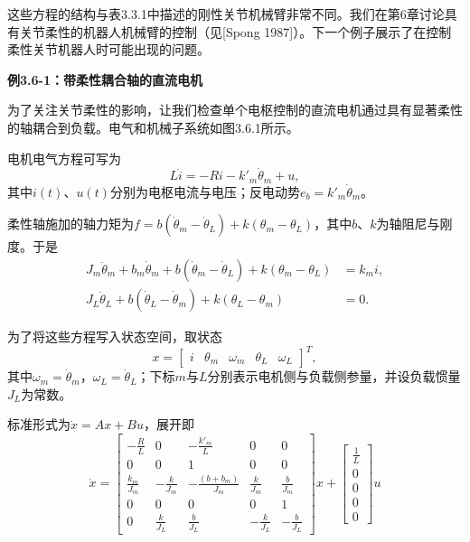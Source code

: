 \documentclass[12pt,a4paper]{ctexart}
\begin{document}
这些方程的结构与表3.3.1中描述的刚性关节机械臂非常不同。我们在第6章讨论具有关节柔性的机器人机械臂的控制（见[Spong 1987]）。下一个例子展示了在控制柔性关节机器人时可能出现的问题。

\textbf{例3.6-1：带柔性耦合轴的直流电机}

为了关注关节柔性的影响，让我们检查单个电枢控制的直流电机通过具有显著柔性的轴耦合到负载。电气和机械子系统如图3.6.1所示。

电机电气方程可写为
\begin{equation}\label{eq:3.6.17}
L\dot{i} = -Ri - k'_m\dot{\theta}_m + u,
\end{equation}
其中$i(t)$、$u(t)$分别为电枢电流与电压；反电动势$e_b = k'_m\dot{\theta}_m$。

柔性轴施加的轴力矩为$f = b(\dot{\theta}_m - \dot{\theta}_L) + k(\theta_m - \theta_L)$，其中$b$、$k$为轴阻尼与刚度。于是
\begin{align}\label{eq:3.6.18}
J_m\ddot{\theta}_m + b_m\dot{\theta}_m + b(\dot{\theta}_m - \dot{\theta}_L) + k(\theta_m - \theta_L) &= k_m i, \\
J_L\ddot{\theta}_L + b(\dot{\theta}_L - \dot{\theta}_m) + k(\theta_L - \theta_m) &= 0.
\end{align}

为了将这些方程写入状态空间，取状态
\begin{equation}\label{eq:3.6.19}
x = \begin{bmatrix} i & \theta_m & \omega_m & \theta_L & \omega_L \end{bmatrix}^T,
\end{equation}
其中$\omega_m=\dot{\theta}_m$，$\omega_L=\dot{\theta}_L$；下标$m$与$L$分别表示电机侧与负载侧参量，并设负载惯量$J_L$为常数。

标准形式为$\dot{x} = Ax + Bu$，展开即
\begin{equation}\label{eq:3.6.20}
\dot{x} = \begin{bmatrix} -\frac{R}{L} & 0 & -\frac{k'_m}{L} & 0 & 0 \\ 0 & 0 & 1 & 0 & 0 \\ \frac{k_m}{J_m} & -\frac{k}{J_m} & -\frac{(b+b_m)}{J_m} & \frac{k}{J_m} & \frac{b}{J_m} \\ 0 & 0 & 0 & 0 & 1 \\ 0 & \frac{k}{J_L} & \frac{b}{J_L} & -\frac{k}{J_L} & -\frac{b}{J_L} \end{bmatrix}x + \begin{bmatrix} \frac{1}{L} \\ 0 \\ 0 \\ 0 \\ 0 \end{bmatrix}u
\end{equation}
\end{document}
